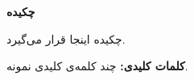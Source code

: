 \chapter*{}
\begin{center}
\vspace{0.9cm}
\large
\textbf{چکیده}
\end{center}
چکیده اینجا قرار می‌گیرد.

\vspace{0.3cm}
\noindent\textbf{کلمات کلیدی:} چند کلمه‌ی کلیدی نمونه.
